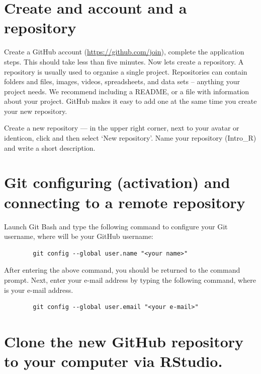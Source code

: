 \documentclass[
]{book}
\begin{document}
\hypertarget{create-and-account-and-a-repository}{%
\section{Create and account and a repository}\label{create-and-account-and-a-repository}}

Create a GitHub account (\url{https://github.com/join}), complete the application steps. This should take less than five minutes. Now lets create a repository. A repository is usually used to organise a single project. Repositories can contain folders and files, images, videos, spreadsheets, and data sets -- anything your project needs. We recommend including a README, or a file with information about your project. GitHub makes it easy to add one at the same time you create your new repository.

Create a new repository --- in the upper right corner, next to your avatar or identicon, click and then select `New repository'. Name your repository (Intro\_R) and write a short description.

\hypertarget{git-configuring-activation-and-connecting-to-a-remote-repository}{%
\section{Git configuring (activation) and connecting to a remote repository}\label{git-configuring-activation-and-connecting-to-a-remote-repository}}

Launch Git Bash and type the following command to configure your Git username, where will be your GitHub username:

\begin{verbatim}
        git config --global user.name "<your name>"
\end{verbatim}

After entering the above command, you should be returned to the command prompt. Next, enter your e-mail address by typing the following command, where is your e-mail address.

\begin{verbatim}
        git config --global user.email "<your e-mail>"
\end{verbatim}

\hypertarget{clone-the-new-github-repository-to-your-computer-via-rstudio.}{%
\section{Clone the new GitHub repository to your computer via RStudio.}\label{clone-the-new-github-repository-to-your-computer-via-rstudio.}}
\end{document}
